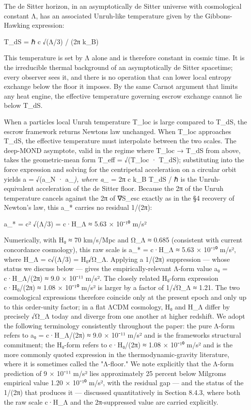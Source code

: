 \documentclass[11pt]{article}
\begin{document}
The de Sitter horizon, in an asymptotically de Sitter universe with cosmological constant Λ, has an associated Unruh-like temperature given by the Gibbons-Hawking expression:

T\_dS = ℏ c √(Λ/3) / (2π k\_B)

This temperature is set by Λ alone and is therefore constant in cosmic time. It is the irreducible thermal background of an asymptotically de Sitter spacetime; every observer sees it, and there is no operation that can lower local entropy exchange below the floor it imposes. By the same Carnot argument that limits any heat engine, the effective temperature governing escrow exchange cannot lie below T\_dS.

When a particle\textquotesingle s local Unruh temperature T\_loc is large compared to T\_dS, the escrow framework returns Newton\textquotesingle s law unchanged. When T\_loc approaches T\_dS, the effective temperature must interpolate between the two scales. The deep-MOND asymptote, valid in the regime where T\_loc → T\_dS from above, takes the geometric-mean form T\_eff = √(T\_loc · T\_dS); substituting into the force expression and solving for the centripetal acceleration on a circular orbit yields a = √(a\_N · a\_\emph{), where a\_} = 2π c k\_B T\_dS / ℏ is the Unruh-equivalent acceleration of the de Sitter floor. Because the 2π of the Unruh temperature cancels against the 2π of ∇S\_esc exactly as in the §4 recovery of Newton's law, this a\_* carries no residual 1/(2π):

a\_* = c² √(Λ/3) = c·H\_Λ ≈ 5.63 × 10⁻¹⁰ m/s²

Numerically, with H₀ ≈ 70 km/s/Mpc and Ω\_Λ ≈ 0.685 (consistent with current concordance cosmology), this raw scale is a\_* = c·H\_Λ ≈ 5.63 × 10⁻¹⁰ m/s², where H\_Λ = c√(Λ/3) = H₀√Ω\_Λ. Applying a 1/(2π) suppression --- whose status we discuss below --- gives the empirically-relevant Λ-form value a₀ = c·H\_Λ/(2π) ≈ 9.0 × 10⁻¹¹ m/s². The closely related H₀-form expression c·H₀/(2π) ≈ 1.08 × 10⁻¹⁰ m/s² is larger by a factor of 1/√Ω\_Λ ≈ 1.21. The two cosmological expressions therefore coincide only at the present epoch and only up to this order-unity factor; in a flat ΛCDM cosmology, H₀ and H\_Λ differ by precisely √Ω\_Λ today and diverge from one another at higher redshift. We adopt the following terminology consistently throughout the paper: the pure Λ-form refers to a₀ = c·H\_Λ/(2π) ≈ 9.0 × 10⁻¹¹ m/s² and is the framework\textquotesingle s structural commitment; the H₀-form refers to c·H₀/(2π) ≈ 1.08 × 10⁻¹⁰ m/s² and is the more commonly quoted expression in the thermodynamic-gravity literature, where it is sometimes called the "Λ-floor." We note explicitly that the Λ-form prediction of 9 × 10⁻¹¹ m/s² lies approximately 25 percent below Milgrom\textquotesingle s empirical value 1.20 × 10⁻¹⁰ m/s², with the residual gap --- and the status of the 1/(2π) that produces it --- discussed quantitatively in Section 8.4.3, where both the raw scale c·H\_Λ and the 2π-suppressed value are carried explicitly.
\end{document}
